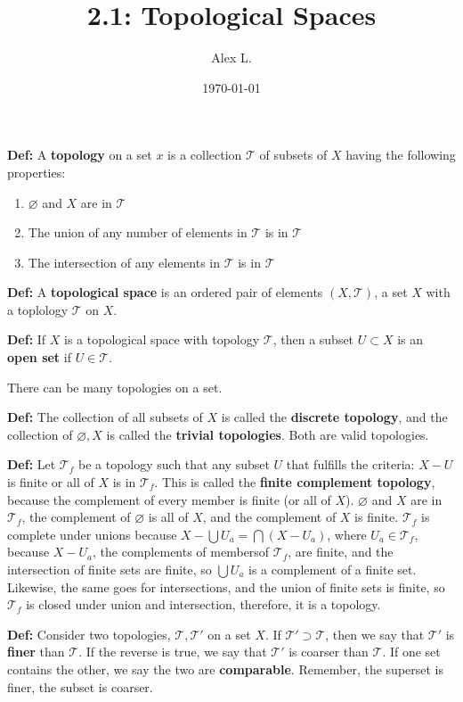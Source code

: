 \documentclass{article}
\title{2.1: Topological Spaces}
\author{Alex L.}
\date{\today}
\begin{document}
\maketitle

\textbf{Def:} A \textbf{topology} on a set $x$ is a collection $\mathcal{T}$ of subsets of $X$ having the following properties:

\begin{enumerate}
    \item $\varnothing$ and $X$ are in $\mathcal{T}$
    \item The union of any number of elements in $\mathcal{T}$ is in $\mathcal{T}$
    \item The intersection of any elements in $\mathcal{T}$ is in $\mathcal{T}$
\end{enumerate}

\textbf{Def:} A \textbf{topological space} is an ordered pair of elements $(X,\mathcal{T})$, a set $X$ with a toplology $\mathcal{T}$ on $X$. 

\textbf{Def:} If $X$ is a topological space with topology $\mathcal{T}$, then a subset $U \subset X$ is an \textbf{open set} if $U \in \mathcal{T}$. 

There can be many topologies on a set. 

\textbf{Def:} The collection of all subsets of $X$ is called the \textbf{discrete topology}, and the collection of ${\varnothing, X}$ is called the \textbf{trivial topologies}. Both are valid topologies.

\textbf{Def:} Let $\mathcal{T}_f$ be a topology such that any subset $U$ that fulfills the criteria: $X-U$ is finite or all of $X$ is in $\mathcal{T}_f$. This is called the \textbf{finite complement topology}, because the complement of every member is finite (or all of $X$). $\varnothing$ and $X$ are in $\mathcal{T}_f$, the complement of $\varnothing$ is all of $X$, and the complement of $X$ is finite. $\mathcal{T}_f$ is complete under unions because $X-\bigcup U_a = \bigcap (X-U_a)$, where $U_a \in \mathcal{T}_f$, because $X-U_a$, the complements of membersof $\mathcal{T}_f$, are finite, and the intersection of finite sets are finite, so $\bigcup U_a$ is a complement of a finite set. Likewise, the same goes for intersections, and the union of finite sets is finite, so $\mathcal{T}_f$ is closed under union and intersection, therefore, it is a topology.     

\textbf{Def:} Consider two topologies, $\mathcal{T}, \mathcal{T'}$ on a set $X$. If $\mathcal{T'} \supset \mathcal{T}$, then we say that $\mathcal{T'}$ is \textbf{finer} than $\mathcal{T}$. If the reverse is true, we say that $\mathcal{T'}$ is coarser than $\mathcal{T}$. If one set contains the other, we say the two are \textbf{comparable}. Remember, the superset is finer, the subset is coarser. 
\end{document}
